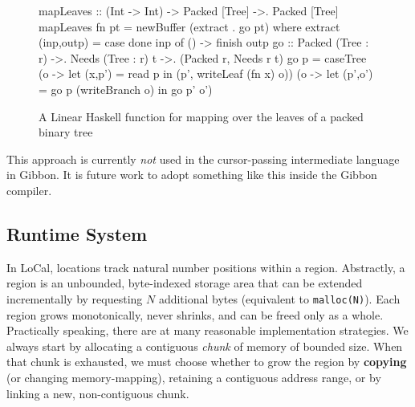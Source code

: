 \documentclass[showabstract,showacknowledgments,showpreface,showdedication,school]{iuphd}
\theoremstyle{nonumberplain}
\newcommand{\sysname}[0]{LoCal\xspace}
\newcommand{\ourcalc}[0]{\sysname}
\newcommand{\il}[1]{\lstinline[style=inline,mathescape=true];#1;}
\begin{document}
\begin{figure}
\begin{code}
mapLeaves :: (Int -> Int) -> Packed [Tree] ->. Packed [Tree]
mapLeaves fn pt = newBuffer (extract . go pt)
  where
    extract (inp,outp) = case done inp of () -> finish outp
    go :: Packed (Tree : r) ->. Needs (Tree : r) t ->.
          (Packed r, Needs r t)
    go p = caseTree (\p o -> let (x,p') = read p
                             in (p', writeLeaf (fn x) o))
                    (\p o -> let (p',o') = go p (writeBranch o)
                             in go p' o')
\end{code}
\caption{A Linear Haskell function for mapping over the leaves of a packed
  binary tree}
\label{fig:linmapleaves}
\end{figure}

This approach is currently \emph{not} used in the cursor-passing intermediate language
in Gibbon. It is future work to adopt something like this inside the Gibbon compiler.

\subsection{Runtime System}\label{subsec:rts}

In \ourcalc, locations track natural number positions within a region.
Abstractly, a region is an unbounded, byte-indexed storage area that can be
extended incrementally by requesting $N$ additional bytes (equivalent to
\il{malloc(N)}).
Each region grows monotonically, never shrinks, and can be
freed only as a whole.
Practically speaking, there are at many reasonable implementation strategies.
We always start by allocating a contiguous {\em chunk} of memory of bounded
size.  When that chunk is exhausted, we must choose whether to grow the
region by {\bf copying} (or changing memory-mapping), retaining a contiguous
address range, or by linking a new, non-contiguous chunk.
\end{document}
